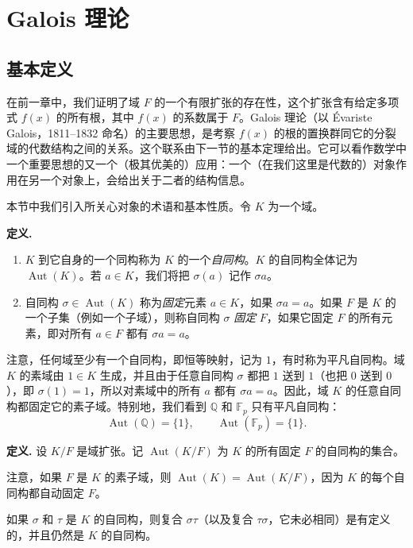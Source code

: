\chapter{Galois 理论}

\section{基本定义}

在前一章中，我们证明了域 $F$ 的一个有限扩张的存在性，这个扩张含有给定多项式 $f(x)$ 的所有根，其中 $f(x)$ 的系数属于 $F$。Galois 理论（以 Évariste Galois，1811--1832 命名）的主要思想，是考察 $f(x)$ 的根的置换群同它的分裂域的代数结构之间的关系。这个联系由下一节的基本定理给出。它可以看作数学中一个重要思想的又一个（极其优美的）应用：一个（在我们这里是代数的）对象作用在另一个对象上，会给出关于二者的结构信息。

本节中我们引入所关心对象的术语和基本性质。令 $K$ 为一个域。

\noindent\textbf{定义.}
\begin{enumerate}[label=(\arabic*)]
\item $K$ 到它自身的一个同构称为 $K$ 的一个\emph{自同构}。$K$ 的自同构全体记为 $\operatorname{Aut}(K)$。若 $a\in K$，我们将把 $\sigma(a)$ 记作 $\sigma a$。
\item 自同构 $\sigma\in\operatorname{Aut}(K)$ 称为\emph{固定}元素 $a\in K$，如果 $\sigma a=a$。如果 $F$ 是 $K$ 的一个子集（例如一个子域），则称自同构 $\sigma$ \emph{固定} $F$，如果它固定 $F$ 的所有元素，即对所有 $a\in F$ 都有 $\sigma a=a$。
\end{enumerate}

注意，任何域至少有一个自同构，即恒等映射，记为 $1$，有时称为平凡自同构。域 $K$ 的素域由 $1\in K$ 生成，并且由于任意自同构 $\sigma$ 都把 $1$ 送到 $1$（也把 $0$ 送到 $0$），即 $\sigma(1)=1$，所以对素域中的所有 $a$ 都有 $\sigma a=a$。因此，域 $K$ 的任意自同构都固定它的素子域。特别地，我们看到 $\mathbb Q$ 和 $\mathbb F_p$ 只有平凡自同构：
\[
\operatorname{Aut}(\mathbb Q)=\{1\},\qquad \operatorname{Aut}(\mathbb F_p)=\{1\}.
\]

\noindent\textbf{定义.} 设 $K/F$ 是域扩张。记 $\operatorname{Aut}(K/F)$ 为 $K$ 的所有固定 $F$ 的自同构的集合。

注意，如果 $F$ 是 $K$ 的素子域，则 $\operatorname{Aut}(K)=\operatorname{Aut}(K/F)$，因为 $K$ 的每个自同构都自动固定 $F$。

如果 $\sigma$ 和 $\tau$ 是 $K$ 的自同构，则复合 $\sigma\tau$（以及复合 $\tau\sigma$，它未必相同）是有定义的，并且仍然是 $K$ 的自同构。

